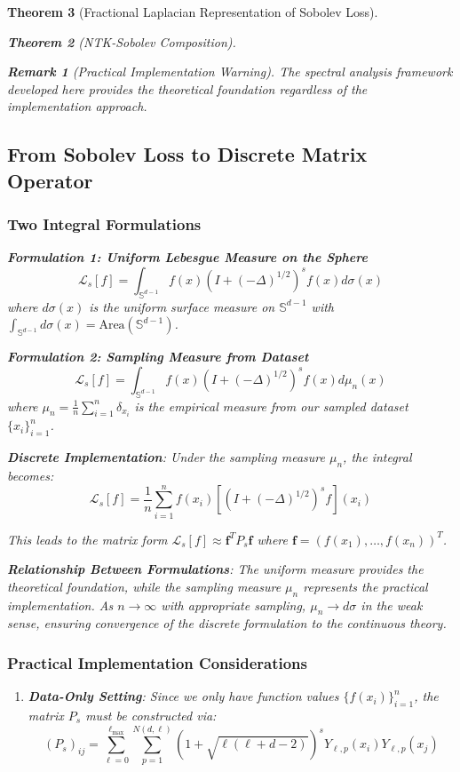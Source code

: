 \documentclass{article}
\newtheorem{theorem}{Theorem}[section]
\newtheorem{remark}[theorem]{Remark}
\begin{document}
\begin{theorem}[Fractional Laplacian Representation of Sobolev Loss]
\begin{theorem}[NTK-Sobolev Composition]
\begin{remark}[Practical Implementation Warning]
The spectral analysis framework developed here provides the theoretical foundation regardless of the implementation approach.
\end{remark}

\subsection{From Sobolev Loss to Discrete Matrix Operator}

\subsubsection{Two Integral Formulations}

\textbf{Formulation 1: Uniform Lebesgue Measure on the Sphere}
\[ \mathcal{L}_s[f] = \int_{\mathbb{S}^{d-1}} f(x) (I + (-\Delta)^{1/2})^s f(x) d\sigma(x) \]
where $d\sigma(x)$ is the uniform surface measure on $\mathbb{S}^{d-1}$ with $\int_{\mathbb{S}^{d-1}} d\sigma(x) = \text{Area}(\mathbb{S}^{d-1})$.

\textbf{Formulation 2: Sampling Measure from Dataset}
\[ \mathcal{L}_s[f] = \int_{\mathbb{S}^{d-1}} f(x) (I + (-\Delta)^{1/2})^s f(x) d\mu_n(x) \]
where $\mu_n = \frac{1}{n}\sum_{i=1}^n \delta_{x_i}$ is the empirical measure from our sampled dataset $\{x_i\}_{i=1}^n$.

\textbf{Discrete Implementation}:
Under the sampling measure $\mu_n$, the integral becomes:
\[ \mathcal{L}_s[f] = \frac{1}{n}\sum_{i=1}^n f(x_i) \left[(I + (-\Delta)^{1/2})^s f\right](x_i) \]

This leads to the matrix form $\mathcal{L}_s[f] \approx \mathbf{f}^T P_s \mathbf{f}$ where $\mathbf{f} = (f(x_1), \ldots, f(x_n))^T$.

\textbf{Relationship Between Formulations}:
The uniform measure provides the theoretical foundation, while the sampling measure $\mu_n$ represents the practical implementation. As $n \to \infty$ with appropriate sampling, $\mu_n \to d\sigma$ in the weak sense, ensuring convergence of the discrete formulation to the continuous theory.

\subsubsection{Practical Implementation Considerations}

\begin{enumerate}
\item \textbf{Data-Only Setting}: Since we only have function values $\{f(x_i)\}_{i=1}^n$, the matrix $P_s$ must be constructed via:
\[ (P_s)_{ij} = \sum_{\ell=0}^{\ell_{\max}} \sum_{p=1}^{N(d,\ell)} (1 + \sqrt{\ell(\ell + d - 2)})^s Y_{\ell,p}(x_i) Y_{\ell,p}(x_j) \]


\end{enumerate}
\end{theorem}
\end{theorem}
\end{document}
